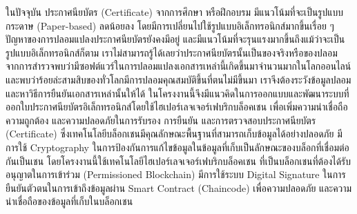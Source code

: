 \maketitle
\makesignature

\ifproject
\begin{abstractTH}
\enskip \enskip \enskip \enskip \enskip  ในปัจจุบัน ประกาศนียบัตร (Certificate) จากการศึกษา หรือฝึกอบรม มีแนวโน้มที่จะเป็นรูปแบบกระดาษ (Paper-based) ลดน้อยลง โดยมีการเปลี่ยนไปใช้รูปแบบอิเล็กทรอนิกส์มากขึ้นเรื่อย ๆ ปัญหาของการปลอมแปลงประกาศนียบัตรยังคงมีอยู่ และมีแนวโน้มที่จะรุนแรงมากขึ้นถึงแม้ว่าจะเป็นรูปแบบอิเล็กทรอนิกส์ก็ตาม เราไม่สามารถรู้ได้เลยว่าประกาศนียบัตรนั้นเป็นของจริงหรือของปลอม
จากการสำรวจพบว่ามีซอฟต์แวร์ในการปลอมแปลงเอกสารเหล่านี้เกิดขึ้นมาจำนวนมากในโลกออนไลน์
และพบว่าร้อยล่ะสามสิบของทั่วโลกมีการปลอมคุณสมบัติขึ้นที่ตนไม่มีขึ้นมา เราจีงต้องระวังข้อมูลปลอมและหาวิธีการยืนยันเอกสารเหล่านั้นให้ได้
 ในโครงงานนี้จึงมีแนวคิดในการออกแบบและพัฒนาระบบที่ออกใบประกาศนียบัตรอิเล็กทรอนิกส์โดยใช้ไฮเปอร์เลจเจอร์เฟบริกบล็อคเชน เพื่อเพิ่มความน่าเชื่อถือ ความถูกต้อง และความปลอดภัยในการรับรอง การยืนยัน และการตรวจสอบประกาศนียบัตร (Certificate) ซึ่งเทคโนโลยีบล็อกเชนมีคุณลักษณะพื้นฐานที่สามารถเก็บข้อมูลได้อย่างปลอดภัย มีการใช้ Cryptography ในการป้องกันการแก้ไขข้อมูลในข้อมูลที่เก็บเป็นลักษณะของบล็อกที่เชื่อมต่อกันเป็นเชน โดยโครงงานนี้ใช้เทคโนโลยีไฮเปอร์เลจเจอร์เฟบริกบล็อคเชน ที่เป็นบล็อกเชนที่ต้องได้รับอนุญาตในการเข้าร่วม (Permissioned Blockchain) มีการใช้ระบบ Digital Signature ในการยืนยันตัวตนในการเข้าถึงข้อมูลผ่าน Smart Contract (Chaincode) เพื่อความปลอดภัย และความน่าเชื่อถือของข้อมูลที่เก็บในบล็อกเชน 

\end{abstractTH}

